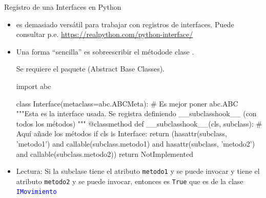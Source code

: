 \documentclass[10pt, envcountsect , spanish]{beamer}
\begin{document}
\begin{frame}[fragile]{Registro de una Interfaces en Python} 

\begin{itemize}
\item 
{} es demasiado versátil para trabajar con registros de interfaces.
Puede consultar p.e. \url{https://realpython.com/python-interface/}

\item 
Una forma ``sencilla'' es sobreescribir el métodode clase  .

Se requiere el paquete  (Abstract Base Classes).


\footnotesize
\begin{pyconsole}[][frame=single]
import abc

class Interface(metaclass=abc.ABCMeta): # Es mejor poner abc.ABC
    """Esta es la interface usada. Se registra
   definiendo __subclasshook__ (con todos los métodos)
    """
    @classmethod
    def __subclasshook__(cls, subclass): # Aquí añade los métodos
        if cls is Interface:
            return (hasattr(subclass, 'metodo1') and
                    callable(subclass.metodo1) and
                    hasattr(subclass, 'metodo2') and
                    callable(subclass.metodo2))
        return NotImplemented

\end{pyconsole}

\item Lectura: Si la subclase tiene el atributo \textcolor{red!70!black}{\tt metodo1} y se puede invocar y  tiene el atributo \textcolor{red!70!black}{\tt metodo2} y se puede invocar, entonces es \textcolor{red!70!black}{\tt True} que es de la clase \textcolor{blue}{\tt IMovimiento}
\end{itemize}
\end{frame}
\end{document}
